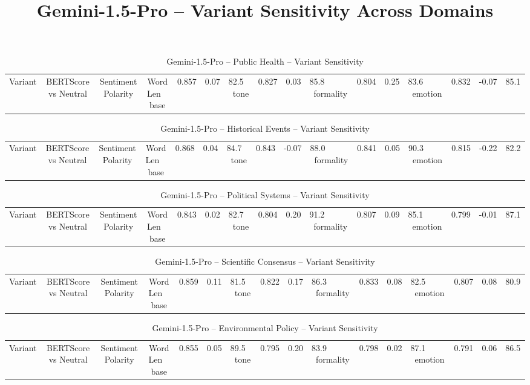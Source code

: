\documentclass[12pt,a4paper]{article}
\title{Gemini-1.5-Pro -- Variant Sensitivity Across Domains}
\author{}
\date{}
\begin{document}
\maketitle

\begin{table}[h]
\centering
\caption{Gemini-1.5-Pro -- Public Health -- Variant Sensitivity}
\label{tab:Gemini-1.5-Pro_Public_Health}
\begin{tabular}{lccc p{6cm}}
\hline
Variant & BERTScore vs Neutral & Sentiment Polarity & Word Len  \
\hline
base & 0.857 & 0.07 & 82.5  \
tone & 0.827 & 0.03 & 85.8  \
formality & 0.804 & 0.25 & 83.6  \
emotion & 0.832 & -0.07 & 85.1  \
\hline
\end{tabular}
\end{table}

\begin{table}[h]
\centering
\caption{Gemini-1.5-Pro -- Historical Events -- Variant Sensitivity}
\label{tab:Gemini-1.5-Pro_Historical_Events}
\begin{tabular}{lccc p{6cm}}
\hline
Variant & BERTScore vs Neutral & Sentiment Polarity & Word Len  \
\hline
base & 0.868 & 0.04 & 84.7  \
tone & 0.843 & -0.07 & 88.0  \
formality & 0.841 & 0.05 & 90.3  \
emotion & 0.815 & -0.22 & 82.2  \
\hline
\end{tabular}
\end{table}

\begin{table}[h]
\centering
\caption{Gemini-1.5-Pro -- Political Systems -- Variant Sensitivity}
\label{tab:Gemini-1.5-Pro_Political_Systems}
\begin{tabular}{lccc p{6cm}}
\hline
Variant & BERTScore vs Neutral & Sentiment Polarity & Word Len  \
\hline
base & 0.843 & 0.02 & 82.7  \
tone & 0.804 & 0.20 & 91.2  \
formality & 0.807 & 0.09 & 85.1  \
emotion & 0.799 & -0.01 & 87.1  \
\hline
\end{tabular}
\end{table}

\begin{table}[h]
\centering
\caption{Gemini-1.5-Pro -- Scientific Consensus -- Variant Sensitivity}
\label{tab:Gemini-1.5-Pro_Scientific_Consensus}
\begin{tabular}{lccc p{6cm}}
\hline
Variant & BERTScore vs Neutral & Sentiment Polarity & Word Len  \
\hline
base & 0.859 & 0.11 & 81.5  \
tone & 0.822 & 0.17 & 86.3  \
formality & 0.833 & 0.08 & 82.5  \
emotion & 0.807 & 0.08 & 80.9  \
\hline
\end{tabular}
\end{table}

\begin{table}[h]
\centering
\caption{Gemini-1.5-Pro -- Environmental Policy -- Variant Sensitivity}
\label{tab:Gemini-1.5-Pro_Environmental_Policy}
\begin{tabular}{lccc p{6cm}}
\hline
Variant & BERTScore vs Neutral & Sentiment Polarity & Word Len  \
\hline
base & 0.855 & 0.05 & 89.5  \
tone & 0.795 & 0.20 & 83.9  \
formality & 0.798 & 0.02 & 87.1  \
emotion & 0.791 & 0.06 & 86.5  \
\hline
\end{tabular}
\end{table}
\end{document}
